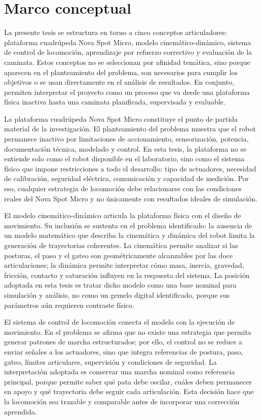 \chapter{Marco conceptual}

La presente tesis se estructura en torno a cinco conceptos articuladores:
plataforma cuadrúpeda Nova Spot Micro, modelo
cinemático-dinámico, sistema de control de locomoción, aprendizaje por refuerzo
correctivo y evaluación de la caminata. Estos conceptos no se seleccionan por
afinidad temática, sino porque aparecen en el planteamiento del problema, son
necesarios para cumplir los objetivos o se usan directamente en el análisis de
resultados. En conjunto, permiten interpretar el proyecto como un proceso que va
desde una plataforma física inactiva hasta una caminata planificada,
supervisada y evaluable.

La plataforma cuadrúpeda Nova Spot Micro constituye el punto de partida material
de la investigación. El planteamiento del problema muestra que el robot
permanece inactivo por limitaciones de accionamiento, sensorización, potencia,
documentación técnica, modelado y control. En esta tesis, la plataforma no se
entiende solo como el robot disponible en el laboratorio, sino como el sistema
físico que impone restricciones a todo el desarrollo: tipo de actuadores,
necesidad de calibración, seguridad eléctrica, comunicación y capacidad de
medición. Por eso, cualquier estrategia de locomoción debe relacionarse con las
condiciones reales del Nova Spot Micro y no únicamente con resultados ideales de
simulación.

El modelo cinemático-dinámico articula la plataforma física con el diseño de
movimiento. Su inclusión se sustenta en el problema identificado: la ausencia de
un modelo matemático que describa la cinemática y dinámica del robot limita la
generación de trayectorias coherentes. La cinemática permite analizar si las
posturas, el paso y el gateo son geométricamente alcanzables por las doce
articulaciones; la dinámica permite interpretar cómo masa, inercia, gravedad,
fricción, contacto y saturación influyen en la respuesta del sistema. La
posición adoptada en esta tesis es tratar dicho modelo como una base nominal
para simulación y análisis, no como un gemelo digital identificado, porque sus
parámetros aún requieren contraste físico.

El sistema de control de locomoción conecta el modelo con la ejecución de
movimiento. En el problema se afirma que no existe una estrategia que permita
generar patrones de marcha estructurados; por ello, el control no se reduce a
enviar señales a los actuadores, sino que integra referencias de postura, paso,
gateo, límites articulares, supervisión y condiciones de seguridad. La
interpretación adoptada es conservar una marcha nominal como referencia
principal, porque permite saber qué pata debe oscilar, cuáles deben permanecer
en apoyo y qué trayectoria debe seguir cada articulación. Esta decisión hace que
la locomoción sea trazable y comparable antes de incorporar una corrección
aprendida.

